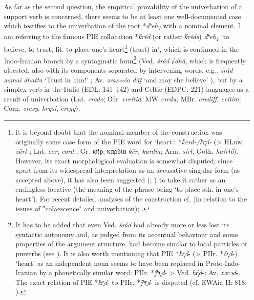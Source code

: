 \documentclass[output=paper,colorlinks,citecolor=brown]{langscibook}
\begin{document}
As far as the second question, the empirical provability of the univerbation of a support verb is concerned, there seems to be at least one well-documented case which testifies to the univerbation of the root *\textit{dʰeh\textsubscript{1}} with a nominal element. I am referring to the famous PIE collocation *\textit{ḱréd} (or rather \textit{ḱréds}) \textit{dʰeh\textsubscript{1}} ‘to believe, to trust; lit. to place one’s heart\footnote{It is beyond doubt that the nominal member of the construction was originally some case form of the PIE word for ‘heart’: *\textit{ḱerd-/ḱr̥d-} (> HLuw. \textit{zārt-}; Lat. \textit{cor}, \textit{cord}-; Gr. κῆρ, καρδία \textit{kēr, kardia}; Arm. \textit{sirt}; Goth. \textit{haírtō}). However, its exact morphological evaluation is somewhat disputed, since apart from its widespread interpretation as an accusative singular form (as accepted above), it has also been suggested (\citealt[6--8]{Sandoz1973}; \citealt[583--584]{Tremblay2004}) to take it rather as an endingless locative (the meaning of the phrase being ‘to place sth. in one’s heart’). For recent detailed analyses of the construction cf. \citet[90--93]{Hackstein2012} (in relation to the issues of ‟colaescence" and univerbation); \citet{Weiss2019}.}                     (trust) in’, which is continued in the Indo-Iranian branch by a syntagmatic form\footnote{It has to be added that even Ved. \textit{śrád} had already more or less lost its syntactic autonomy and, as judged from its accentual behaviour and some properties of the argument structure, had become similar to local particles or preverbs (see \citealt[92]{Hackstein2012}). It is also worth mentioning that PIE *\textit{ḱr̥d}- (> PIIr. *\textit{ćr̥d}-) ‘heart’ as an independent noun seems to have been replaced in Proto-Indo-Iranian by a phonetically similar word: PIIr. *\textit{j́ʰr̥d}- > Ved. \textit{hŕ̥d}-; Av. \textit{zərəd}-. The exact relation of PIE *\textit{ḱr̥d}- to PIIr. *\textit{j́ʰr̥d}- is disputed (cf. EWAia II: 818; \citealt[271]{Weiss2019}).}                      (Ved. \textit{śrád} √\textit{dhā}, which is frequently attested, also with its components separated by intervening words, e.g., \textit{śrád asmai dhatta} ‘Trust in him!’ ; Av. \textit{zras=ča dāt̰} ‘and may she believe’ ), but by a simplex verb in the Italic (EDL: 141–142) and Celtic (EDPC: 221) languages as a result of univerbation (Lat. \textit{credo}; OIr. \textit{creitid}; MW \textit{credu}; MBr. \textit{crediff}, \textit{critim}; Corn. \textit{cresy}, \textit{krysi}, \textit{cregy}).
\end{document}
